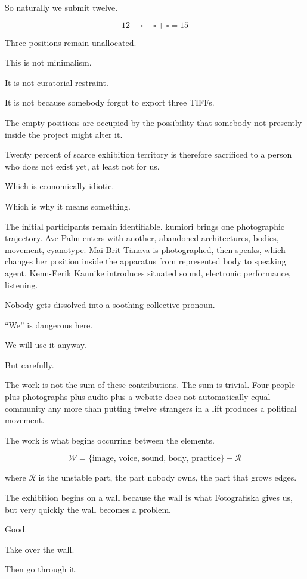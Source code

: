 So naturally we submit twelve.

\[
12+\square+\square+\square=15
\]

Three positions remain unallocated.

This is not minimalism.

It is not curatorial restraint.

It is not because somebody forgot to export three TIFFs.

The empty positions are occupied by the possibility that somebody not
presently inside the project might alter it.

Twenty percent of scarce exhibition territory is therefore sacrificed to
a person who does not exist yet, at least not for us.

Which is economically idiotic.

Which is why it means something.

The initial participants remain identifiable. kumiori brings one
photographic trajectory. Ave Palm enters with another, abandoned
architectures, bodies, movement, cyanotype. Mai-Brit Tänava is
photographed, then speaks, which changes her position inside the
apparatus from represented body to speaking agent. Kenn-Eerik Kannike
introduces situated sound, electronic performance, listening.

Nobody gets dissolved into a soothing collective pronoun.

``We'' is dangerous here.

We will use it anyway.

But carefully.

The work is not the sum of these contributions. The sum is trivial. Four
people plus photographs plus audio plus a website does not automatically
equal community any more than putting twelve strangers in a lift
produces a political movement.

The work is what begins occurring between the elements.

\[
\mathcal W=\{\text{image, voice, sound, body, practice}\}-\mathcal R
\]

where $\mathcal R$ is the unstable part, the part nobody owns, the part
that grows edges.

The exhibition begins on a wall because the wall is what Fotografiska
gives us, but very quickly the wall becomes a problem.

Good.

Take over the wall.

Then go through it.

